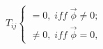 \begin{equation}
T_{ij}\left\{ 
\begin{array}{l}
=0,\;iff\;\vec{\phi}\neq 0; \\ 
\neq 0,\;iff\;\vec{\phi}=0,
\end{array}
\right.
\end{equation}

